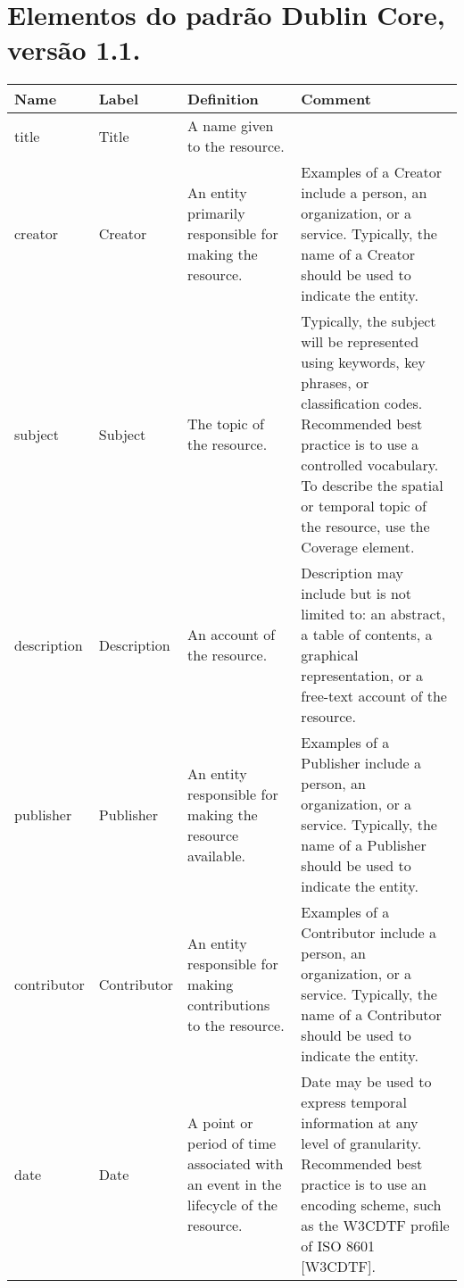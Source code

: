 
\chapter{Elementos do padrão Dublin Core, versão 1.1.}
\label{attach:dublin-core}

\begin{flushleft}

    \begin{longtable}{|p{2cm}|p{2cm}|p{4cm}|p{6cm}|}
        \hline \textbf{Name} & \textbf{Label} & \textbf{Definition} & \textbf{Comment}\\ 
        \hline title & Title & A name given to the resource. & \\
        \hline creator & Creator & An entity primarily responsible for making the resource. & Examples of a Creator include a person, an organization, or a service.  Typically, the name of a Creator should be used to indicate the entity.\\
        \hline subject & Subject & The topic of the resource. & Typically, the subject will be represented using keywords, key phrases, or classification codes. Recommended best practice is to use a controlled vocabulary. To describe the spatial or temporal topic of the resource, use the Coverage element.\\
        \hline description & Description & An account of the resource. & Description may include but is not limited to: an abstract, a table of contents, a graphical representation, or a free-text account of the resource.\\
        \hline publisher & Publisher & An entity responsible for making the resource available. & Examples of a Publisher include a person, an organization, or a service.  Typically, the name of a Publisher should be used to indicate the entity.\\
        \hline contributor & Contributor & An entity responsible for making contributions to the resource. & Examples of a Contributor include a person, an organization, or a service. Typically, the name of a Contributor should be used to indicate the entity.\\
        \hline date & Date & A point or period of time associated with an event in the lifecycle of the resource. & Date may be used to express temporal information at any level of granularity.  Recommended best practice is to use an encoding scheme, such as the W3CDTF profile of ISO 8601 [W3CDTF].\\

\end{longtable}
\end{flushleft}
